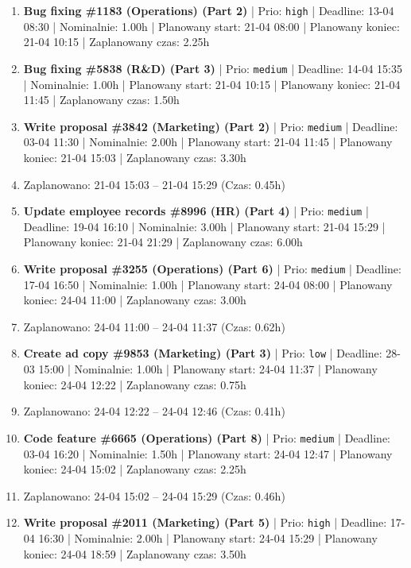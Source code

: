 {\begin{enumerate}
  \item [\textbf{14613}] \textbf{Bug fixing \#1183 (Operations) (Part 2)} | Prio: \texttt{high} | Deadline: 13-04 08:30 | Nominalnie: 1.00h | Planowany start: 21-04 08:00 | Planowany koniec: 21-04 10:15 | Zaplanowany czas: 2.25h
  \item [\textbf{14637}] \textbf{Bug fixing \#5838 (R\&D) (Part 3)} | Prio: \texttt{medium} | Deadline: 14-04 15:35 | Nominalnie: 1.00h | Planowany start: 21-04 10:15 | Planowany koniec: 21-04 11:45 | Zaplanowany czas: 1.50h
  \item [\textbf{14673}] \textbf{Write proposal \#3842 (Marketing) (Part 2)} | Prio: \texttt{medium} | Deadline: 03-04 11:30 | Nominalnie: 2.00h | Planowany start: 21-04 11:45 | Planowany koniec: 21-04 15:03 | Zaplanowany czas: 3.30h
  \item [\textbf{PRZERWA}] Zaplanowano: 21-04 15:03 -- 21-04 15:29 (Czas: 0.45h)
  \item [\textbf{14655}] \textbf{Update employee records \#8996 (HR) (Part 4)} | Prio: \texttt{medium} | Deadline: 19-04 16:10 | Nominalnie: 3.00h | Planowany start: 21-04 15:29 | Planowany koniec: 21-04 21:29 | Zaplanowany czas: 6.00h
  \item [\textbf{14654}] \textbf{Write proposal \#3255 (Operations) (Part 6)} | Prio: \texttt{medium} | Deadline: 17-04 16:50 | Nominalnie: 1.00h | Planowany start: 24-04 08:00 | Planowany koniec: 24-04 11:00 | Zaplanowany czas: 3.00h
  \item [\textbf{PRZERWA}] Zaplanowano: 24-04 11:00 -- 24-04 11:37 (Czas: 0.62h)
  \item [\textbf{14679}] \textbf{Create ad copy \#9853 (Marketing) (Part 3)} | Prio: \texttt{low} | Deadline: 28-03 15:00 | Nominalnie: 1.00h | Planowany start: 24-04 11:37 | Planowany koniec: 24-04 12:22 | Zaplanowany czas: 0.75h
  \item [\textbf{PRZERWA}] Zaplanowano: 24-04 12:22 -- 24-04 12:46 (Czas: 0.41h)
  \item [\textbf{14667}] \textbf{Code feature \#6665 (Operations) (Part 8)} | Prio: \texttt{medium} | Deadline: 03-04 16:20 | Nominalnie: 1.50h | Planowany start: 24-04 12:47 | Planowany koniec: 24-04 15:02 | Zaplanowany czas: 2.25h
  \item [\textbf{PRZERWA}] Zaplanowano: 24-04 15:02 -- 24-04 15:29 (Czas: 0.46h)
  \item [\textbf{14628}] \textbf{Write proposal \#2011 (Marketing) (Part 5)} | Prio: \texttt{high} | Deadline: 17-04 16:30 | Nominalnie: 2.00h | Planowany start: 24-04 15:29 | Planowany koniec: 24-04 18:59 | Zaplanowany czas: 3.50h

\end{enumerate}}
